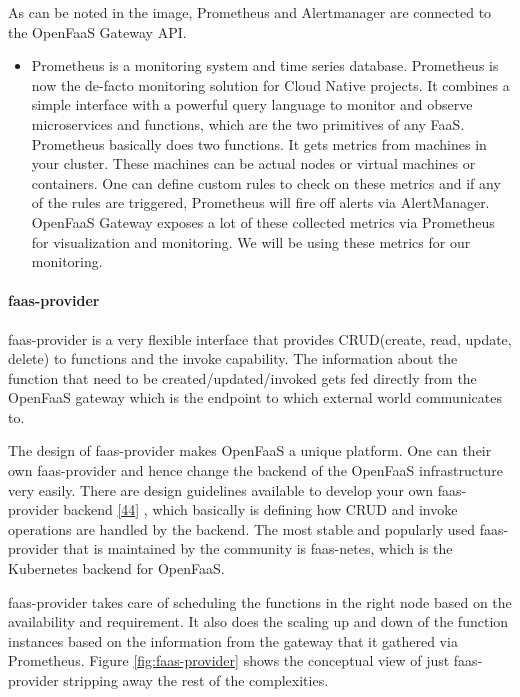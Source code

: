 \documentclass[12pt,titlepage]{article}
\begin{document}
As can be noted in the image, Prometheus and Alertmanager are connected to the
OpenFaaS Gateway API.

\begin{itemize}
\item Prometheus is a monitoring system and time series database. Prometheus is now
the de-facto monitoring solution for Cloud Native projects. It combines a
simple interface with a powerful query language to monitor and observe
microservices and functions, which are the two primitives of any FaaS.
Prometheus basically does two functions. It gets metrics from machines in your
cluster. These machines can be actual nodes or virtual machines or containers.
One can define custom rules to check on these metrics and if any of the rules
are triggered, Prometheus will fire off alerts via AlertManager. OpenFaaS
Gateway exposes a lot of these collected metrics via Prometheus for
visualization and monitoring. We will be using these metrics for our monitoring.
\end{itemize}

\paragraph{faas-provider}
\label{sec:orgca32907}
faas-provider is a very flexible interface that provides CRUD(create, read,
update, delete) to functions and the invoke capability. The information about
the function that need to be created/updated/invoked gets fed directly from the
OpenFaaS gateway which is the endpoint to which external world communicates to.

The design of faas-provider makes OpenFaaS a unique platform. One can their own
faas-provider and hence change the backend of the OpenFaaS infrastructure very
easily. There are design guidelines available to develop your own faas-provider
backend \hyperref[ref:44]{[44}] , which basically is defining how CRUD and invoke operations
are handled by the backend. The most stable and popularly used faas-provider
that is maintained  by the community is faas-netes, which is the Kubernetes
backend for OpenFaaS.

faas-provider takes care of scheduling the functions in the right node based on
the availability and requirement. It also does the scaling up and down
of the function instances based on the information from the gateway that it
gathered via Prometheus. Figure \ref{fig:faas-provider} shows the conceptual view of just
faas-provider stripping away the rest of the complexities.
\end{document}
